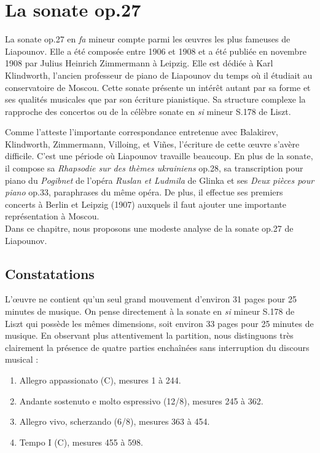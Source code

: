 
\chapter{La sonate op.27}

La sonate op.27 en \emph{fa} mineur compte parmi les œuvres les plus fameuses de Liapounov. Elle a été composée entre 1906 et 1908 et a été publiée en novembre 1908 par Julius Heinrich Zimmermann à Leipzig. Elle est dédiée à Karl Klindworth, l'ancien professeur de piano de Liapounov du temps où il étudiait au conservatoire de Moscou. Cette sonate présente un intérêt autant par sa forme et ses qualités musicales que par son écriture pianistique. Sa structure complexe la rapproche des concertos ou de la célèbre sonate en \emph{si} mineur S.178 de Liszt.

Comme l'atteste l'importante correspondance entretenue avec Balakirev, Klindworth, Zimmermann, Villoing, et Viñes, l'écriture de cette œuvre s'avère difficile. C'est une période où Liapounov travaille beaucoup. En plus de la sonate, il compose sa \emph{Rhapsodie sur des thèmes ukrainiens} op.28, sa transcription pour piano du \emph{Pogibnet} de l'opéra \emph{Ruslan et Ludmila} de Glinka et ses \emph{Deux pièces pour piano} op.33, paraphrases du même opéra. De plus, il effectue ses premiers concerts à Berlin et Leipzig (1907) auxquels il faut ajouter une importante représentation à Moscou.\\

Dans ce chapitre, nous proposons une modeste analyse de la sonate op.27 de Liapounov.

\section{Constatations}

L'œuvre ne contient qu'un seul grand mouvement d'environ 31 pages pour 25 minutes de musique. On pense directement à la sonate en \emph{si} mineur S.178 de Liszt qui possède les mêmes dimensions, soit environ 33 pages pour 25 minutes de musique. En observant plus attentivement la partition, nous distinguons très clairement la présence de quatre parties enchaînées sans interruption du discours musical :
\begin{enumerate}
  \item Allegro appassionato (C), mesures 1 à 244.
  \item Andante sostenuto e molto espressivo (12/8), mesures 245 à 362.
  \item Allegro vivo, scherzando (6/8), mesures 363 à 454.
  \item Tempo I (C), mesures 455 à 598.\\
\end{enumerate}

